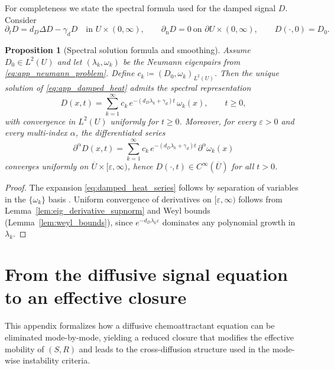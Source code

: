 \documentclass[pdflatex,sn-mathphys-ay]{sn-jnl}
\theoremstyle{thmstyleone}
\newtheorem{proposition}[theorem]{Proposition}
\theoremstyle{definition}
\theoremstyle{remark}
\begin{document}
For completeness we state the spectral formula used for the damped signal $D$.
Consider
\begin{equation}
\label{eq:app_damped_heat}
\partial_t D = d_D\Delta D-\gamma_d D
\quad\text{in }U\times(0,\infty),\qquad
\partial_{\mathrm n}D=0\ \text{on }\partial U\times(0,\infty),\qquad
D(\cdot,0)=D_0.
\end{equation}

\begin{proposition}[Spectral solution formula and smoothing]
\label{prop:damped_heat_spectral}
Assume $D_0\in L^2(U)$ and let $(\lambda_k,\omega_k)$ be the Neumann eigenpairs from \eqref{eq:app_neumann_problem}.
Define $c_k\coloneqq (D_0,\omega_k)_{L^2(U)}$.
Then the unique solution of \eqref{eq:app_damped_heat} admits the spectral representation
\begin{equation}
\label{eq:damped_heat_series}
D(x,t)=\sum_{k=1}^\infty c_k\,e^{-(d_D\lambda_k+\gamma_d)t}\,\omega_k(x),
\qquad t\ge0,
\end{equation}
with convergence in $L^2(U)$ uniformly for $t\ge0$.
Moreover, for every $\varepsilon>0$ and every multi-index $\alpha$, the differentiated series
\[
\partial^\alpha D(x,t)=\sum_{k=1}^\infty c_k\,e^{-(d_D\lambda_k+\gamma_d)t}\,\partial^\alpha\omega_k(x)
\]
converges uniformly on $\overline U\times[\varepsilon,\infty)$, hence $D(\cdot,t)\in C^\infty(\overline U)$ for all $t>0$.
\end{proposition}

\begin{proof}
The expansion \eqref{eq:damped_heat_series} follows by separation of variables in the $\{\omega_k\}$ basis \citep{brezis_functional_2011}.
Uniform convergence of derivatives on $[\varepsilon,\infty)$ follows from Lemma~\ref{lem:eig_derivative_supnorm} and Weyl bounds
(Lemma~\ref{lem:weyl_bounds}), since $e^{-d_D\lambda_k\varepsilon}$ dominates any polynomial growth in $\lambda_k$.
\end{proof}

\section{From the diffusive signal equation to an effective closure}
\label{app:closure}

This appendix formalizes how a diffusive chemoattractant equation can be eliminated mode-by-mode, yielding a reduced
closure that modifies the effective mobility of $(S,R)$ and leads to the cross-diffusion structure used in the
mode-wise instability criteria.
\end{document}
